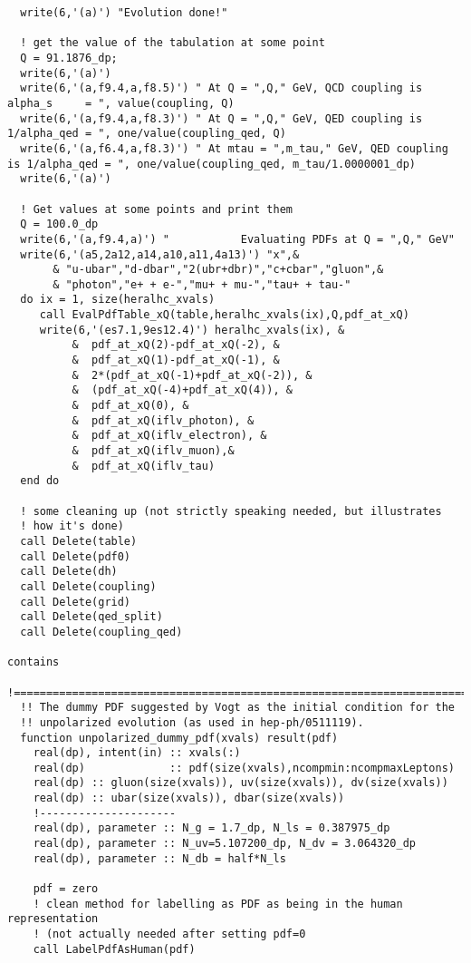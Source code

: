 \documentclass[12pt]{article}
\begin{document}
\begin{lstlisting}
  write(6,'(a)') "Evolution done!"

  ! get the value of the tabulation at some point
  Q = 91.1876_dp;
  write(6,'(a)')
  write(6,'(a,f9.4,a,f8.5)') " At Q = ",Q," GeV, QCD coupling is alpha_s     = ", value(coupling, Q)
  write(6,'(a,f9.4,a,f8.3)') " At Q = ",Q," GeV, QED coupling is 1/alpha_qed = ", one/value(coupling_qed, Q)
  write(6,'(a,f6.4,a,f8.3)') " At mtau = ",m_tau," GeV, QED coupling is 1/alpha_qed = ", one/value(coupling_qed, m_tau/1.0000001_dp)
  write(6,'(a)')

  ! Get values at some points and print them 
  Q = 100.0_dp
  write(6,'(a,f9.4,a)') "           Evaluating PDFs at Q = ",Q," GeV"
  write(6,'(a5,2a12,a14,a10,a11,4a13)') "x",&
       & "u-ubar","d-dbar","2(ubr+dbr)","c+cbar","gluon",&
       & "photon","e+ + e-","mu+ + mu-","tau+ + tau-"
  do ix = 1, size(heralhc_xvals)
     call EvalPdfTable_xQ(table,heralhc_xvals(ix),Q,pdf_at_xQ)
     write(6,'(es7.1,9es12.4)') heralhc_xvals(ix), &
          &  pdf_at_xQ(2)-pdf_at_xQ(-2), &
          &  pdf_at_xQ(1)-pdf_at_xQ(-1), &
          &  2*(pdf_at_xQ(-1)+pdf_at_xQ(-2)), &
          &  (pdf_at_xQ(-4)+pdf_at_xQ(4)), &
          &  pdf_at_xQ(0), &
          &  pdf_at_xQ(iflv_photon), &
          &  pdf_at_xQ(iflv_electron), &
          &  pdf_at_xQ(iflv_muon),&
          &  pdf_at_xQ(iflv_tau)          
  end do
  
  ! some cleaning up (not strictly speaking needed, but illustrates
  ! how it's done)
  call Delete(table)
  call Delete(pdf0)
  call Delete(dh)
  call Delete(coupling)
  call Delete(grid)
  call Delete(qed_split)
  call Delete(coupling_qed)

contains 
  !======================================================================
  !! The dummy PDF suggested by Vogt as the initial condition for the 
  !! unpolarized evolution (as used in hep-ph/0511119).
  function unpolarized_dummy_pdf(xvals) result(pdf)
    real(dp), intent(in) :: xvals(:)
    real(dp)             :: pdf(size(xvals),ncompmin:ncompmaxLeptons)
    real(dp) :: gluon(size(xvals)), uv(size(xvals)), dv(size(xvals))
    real(dp) :: ubar(size(xvals)), dbar(size(xvals))
    !---------------------
    real(dp), parameter :: N_g = 1.7_dp, N_ls = 0.387975_dp
    real(dp), parameter :: N_uv=5.107200_dp, N_dv = 3.064320_dp
    real(dp), parameter :: N_db = half*N_ls
  
    pdf = zero
    ! clean method for labelling as PDF as being in the human representation
    ! (not actually needed after setting pdf=0
    call LabelPdfAsHuman(pdf)


\end{lstlisting}
\end{document}

